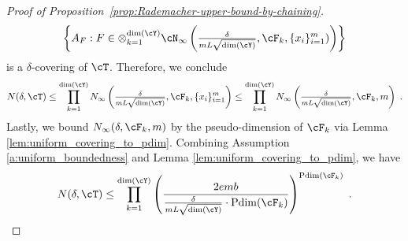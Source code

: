 \documentclass[11pt]{article}
\begin{document}
\begin{proof}[Proof of Proposition~\ref{prop:Rademacher-upper-bound-by-chaining}]
	\begin{equation*}
		\left\{ A_F : F \in \otimes_{k = 1}^{\mathrm{dim}(\cY)}\cN_\infty \left( \tfrac{\delta}{m L \sqrt{\mathrm{dim}(\cY)}}, \cF_{k}, \{x_i\}_{i = 1}^{m}) \right) \right\}
	\end{equation*}
	is a $\delta$-covering of $\cT$. Therefore, we conclude
	\begin{equation*}
		N(\delta, \cT) 
		\le
		\prod_{k=1}^{{\rm dim}(\cY)} N_\infty \left(\tfrac{\delta}{m L \sqrt{\mathrm{dim}(\cY)}}, \cF_{k}, \{x_i\}_{i = 1}^{m} \right) 
		\le \prod_{k=1}^{{\rm dim}(\cY)} N_\infty \left(\tfrac{\delta}{m L \sqrt{\mathrm{dim}(\cY)}}, \cF_{k}, m \right) \;.
	\end{equation*}
	Lastly, we bound $N_\infty(\delta, \cF_k, m)$ by the pseudo-dimension of $\cF_k$ via Lemma \ref{lem:uniform_covering_to_pdim}. Combining Assumption \ref{a:uniform_boundedness} and Lemma \ref{lem:uniform_covering_to_pdim}, we have 
	\begin{align*}
		N(\delta, \cT) 
		\leq \prod_{k=1}^{{\rm dim}(\cY)} \left( \frac{2 e m b}{ \tfrac{\delta}{m L \sqrt{\mathrm{dim}(\cY)}} \cdot {\rm Pdim}(\cF_{k})} \right)^{{\rm Pdim}(\cF_{k})} \;.
	\end{align*}


\end{proof}
\end{document}
